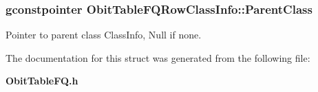 \subsubsection{\setlength{\rightskip}{0pt plus 5cm}gconstpointer {\bf Obit\-Table\-FQRow\-Class\-Info::Parent\-Class}}\label{structObitTableFQRowClassInfo_o3}


Pointer to parent class Class\-Info, Null if none. 



The documentation for this struct was generated from the following file:\begin{CompactItemize}
\item 
{\bf Obit\-Table\-FQ.h}\end{CompactItemize}
